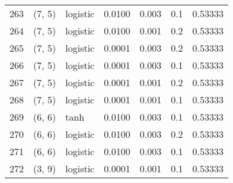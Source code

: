 \begin{tabular}{lllrrrr}
263 &      (7, 5) &  logistic &  0.0100 &  0.003 &  0.1 &   0.53333 \\
264 &      (7, 5) &  logistic &  0.0100 &  0.001 &  0.2 &   0.53333 \\
265 &      (7, 5) &  logistic &  0.0001 &  0.003 &  0.2 &   0.53333 \\
266 &      (7, 5) &  logistic &  0.0001 &  0.003 &  0.1 &   0.53333 \\
267 &      (7, 5) &  logistic &  0.0001 &  0.001 &  0.2 &   0.53333 \\
268 &      (7, 5) &  logistic &  0.0001 &  0.001 &  0.1 &   0.53333 \\
269 &      (6, 6) &      tanh &  0.0100 &  0.003 &  0.1 &   0.53333 \\
270 &      (6, 6) &  logistic &  0.0100 &  0.003 &  0.2 &   0.53333 \\
271 &      (6, 6) &  logistic &  0.0100 &  0.003 &  0.1 &   0.53333 \\
272 &      (3, 9) &  logistic &  0.0001 &  0.001 &  0.1 &   0.53333 \\
\bottomrule
\end{tabular}
